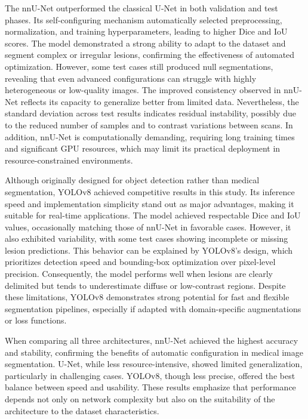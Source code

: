 \documentclass[12pt]{article}
\begin{document}
The nnU-Net outperformed the classical U-Net in both validation and test phases. Its self-configuring mechanism automatically selected preprocessing, normalization, and training hyperparameters, leading to higher Dice and IoU scores. The model demonstrated a strong ability to adapt to the dataset and segment complex or irregular lesions, confirming the effectiveness of automated optimization. However, some test cases still produced null segmentations, revealing that even advanced configurations can struggle with highly heterogeneous or low-quality images.
%
The improved consistency observed in nnU-Net reflects its capacity to generalize better from limited data. Nevertheless, the standard deviation across test results indicates residual instability, possibly due to the reduced number of samples and to contrast variations between scans. In addition, nnU-Net is computationally demanding, requiring long training times and significant GPU resources, which may limit its practical deployment in resource-constrained environments.

Although originally designed for object detection rather than medical segmentation, YOLOv8 achieved competitive results in this study. Its inference speed and implementation simplicity stand out as major advantages, making it suitable for real-time applications. The model achieved respectable Dice and IoU values, occasionally matching those of nnU-Net in favorable cases. However, it also exhibited variability, with some test cases showing incomplete or missing lesion predictions.
%
This behavior can be explained by YOLOv8’s design, which prioritizes detection speed and bounding-box optimization over pixel-level precision. Consequently, the model performs well when lesions are clearly delimited but tends to underestimate diffuse or low-contrast regions. Despite these limitations, YOLOv8 demonstrates strong potential for fast and flexible segmentation pipelines, especially if adapted with domain-specific augmentations or loss functions.

When comparing all three architectures, nnU-Net achieved the highest accuracy and stability, confirming the benefits of automatic configuration in medical image segmentation. U-Net, while less resource-intensive, showed limited generalization, particularly in challenging cases. YOLOv8, though less precise, offered the best balance between speed and usability. These results emphasize that performance depends not only on network complexity but also on the suitability of the architecture to the dataset characteristics. 
\end{document}
